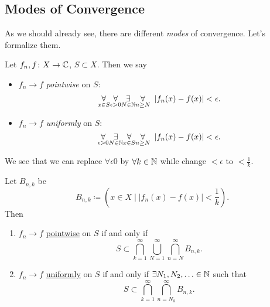 \subsection{Modes of Convergence}
As we should already see, there are different \emph{modes} of convergence. Let's formalize them.
\begin{definition}\label{def:pointwise-convergence}\label{def:uniformly-convergence}
	Let \(f_{n}, f\colon X\to \mathbb{\MakeUppercase{c}} \), \(S\subset X\). Then we say
	\begin{itemize}
		\item \(f_{n}\to f\) \emph{pointwise} on \(S\):
		      \[
			      \underset{x\in S}{\forall}\underset{\epsilon>0}{\forall} \underset{ N\in \mathbb{\MakeUppercase{N}}}{\exists}\underset{n\geq  N}{\forall}\ \left\vert f_{n}(x) - f(x) \right\vert < \epsilon.
		      \]
		\item \(f_{n}\to f\) \emph{uniformly} on \(S\):
		      \[
			      \underset{\epsilon >0}{\forall}\underset{N\in\mathbb{\MakeUppercase{n}}}{\exists}\underset{x\in S}{\forall}\underset{n\geq N}{\forall}\ \left\vert f_{n}(x) - f(x) \right\vert < \epsilon.
		      \]
	\end{itemize}
\end{definition}

\begin{remark}
	We see that we can replace \(\forall \epsilon 0\) by \(\forall k\in \mathbb{\MakeUppercase{n}} \) while change \(< \epsilon \) to \(< \frac{1}{k}\).
\end{remark}
\begin{lemma}
	Let \(B_{n, k}\) be
	\[
		B_{n, k}\coloneqq \left(x\in X \mid \left\vert f_{n}(x) - f(x) \right\vert < \frac{1}{k}\right).
	\]
	Then
	\begin{enumerate}
		\item \(f_{n}\to f\) \hyperref[def:pointwise-convergence]{pointwise} on \(S\) if and only if
		      \[
			      S\subset \bigcap\limits_{k=1}^{\infty} \bigcup\limits_{N=1}^{\infty} \bigcap\limits_{n=N}^{\infty} B_{n, k}.
		      \]
		\item \(f_{n}\to f\) \hyperref[def:uniformaly-convergence]{uniformly} on \(S\) if and only if \(\exists N_1, N_2, \ldots \in \mathbb{\MakeUppercase{n}}\) such that
		      \[
			      S\subset \bigcap\limits_{k=1}^{\infty} \bigcap\limits_{n=N_{k}}^{\infty} B_{n, k}.
		      \]
	\end{enumerate}
\end{lemma}

